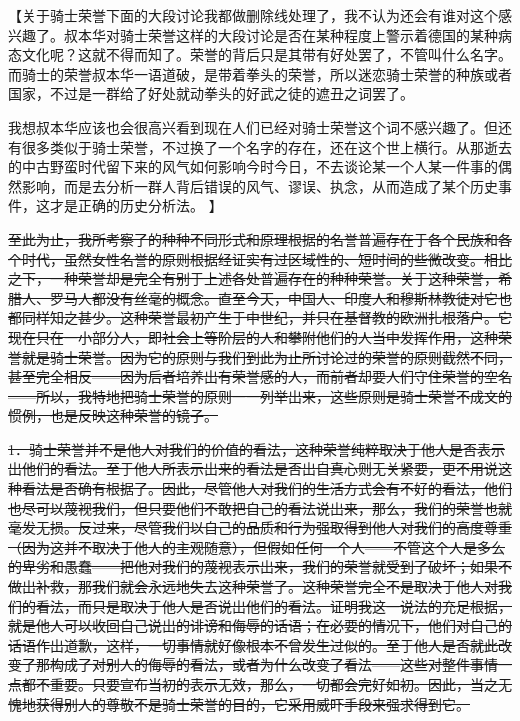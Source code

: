 \documentclass[12pt,oneside]{book}
\begin{document}
【关于骑士荣誉下面的大段讨论我都做删除线处理了，我不认为还会有谁对这个感兴趣了。叔本华对骑士荣誉这样的大段讨论是否在某种程度上警示着德国的某种病态文化呢？这就不得而知了。荣誉的背后只是其带有好处罢了，不管叫什么名字。而骑士的荣誉叔本华一语道破，是带着拳头的荣誉，所以迷恋骑士荣誉的种族或者国家，不过是一群给了好处就动拳头的好武之徒的遮丑之词罢了。

我想叔本华应该也会很高兴看到现在人们已经对骑士荣誉这个词不感兴趣了。但还有很多类似于骑士荣誉，不过换了一个名字的存在，还在这个世上横行。从那逝去的中古野蛮时代留下来的风气如何影响今时今日，不去谈论某一个人某一件事的偶然影响，而是去分析一群人背后错误的风气、谬误、执念，从而造成了某个历史事件，这才是正确的历史分析法。
】

\sout{至此为止，我所考察了的种种不同形式和原理根据的名誉普遍存在于各个民族和各个时代，虽然女性名誉的原则根据经证实有过区域性的、短时间的些微改变。相比之下，一种荣誉却是完全有别于上述各处普遍存在的种种荣誉。关于这种荣誉，希腊人、罗马人都没有丝毫的概念。直至今天，中国人、印度人和穆斯林教徒对它也都同样知之甚少。这种荣誉最初产生于中世纪，并只在基督教的欧洲扎根落户。它现在只在一小部分人，即社会上等阶层的人和攀附他们的人当中发挥作用，这种荣誉就是骑士荣誉。因为它的原则与我们到此为止所讨论过的荣誉的原则截然不同，甚至完全相反——因为后者培养出有荣誉感的人，而前者却要人们守住荣誉的空名——所以，我特地把骑士荣誉的原则一一列举出来，这些原则是骑士荣誉不成文的惯例，也是反映这种荣誉的镜子。 }

\sout{1．骑士荣誉并不是他人对我们的价值的看法，这种荣誉纯粹取决于他人是否表示出他们的看法。至于他人所表示出来的看法是否出自真心则无关紧要，更不用说这种看法是否确有根据了。因此，尽管他人对我们的生活方式会有不好的看法，他们也尽可以蔑视我们，但只要他们不敢把自己的看法说出来，那么，我们的荣誉也就毫发无损。反过来，尽管我们以自己的品质和行为强取得到他人对我们的高度尊重（因为这并不取决于他人的主观随意），但假如任何一个人——不管这个人是多么的卑劣和愚蠢——把他对我们的蔑视表示出来，我们的荣誉就受到了破坏；如果不做出补救，那我们就会永远地失去这种荣誉了。这种荣誉完全不是取决于他人对我们的看法，而只是取决于他人是否说出他们的看法。证明我这一说法的充足根据，就是他人可以收回自己说出的诽谤和侮辱的话语；在必要的情况下，他们对自己的话语作出道歉，这样，一切事情就好像根本不曾发生过似的。至于他人是否就此改变了那构成了对别人的侮辱的看法，或者为什么改变了看法——这些对整件事情一点都不重要。只要宣布当初的表示无效，那么，一切都会完好如初。因此，当之无愧地获得别人的尊敬不是骑士荣誉的目的，它采用威吓手段来强求得到它。 }
\end{document}

